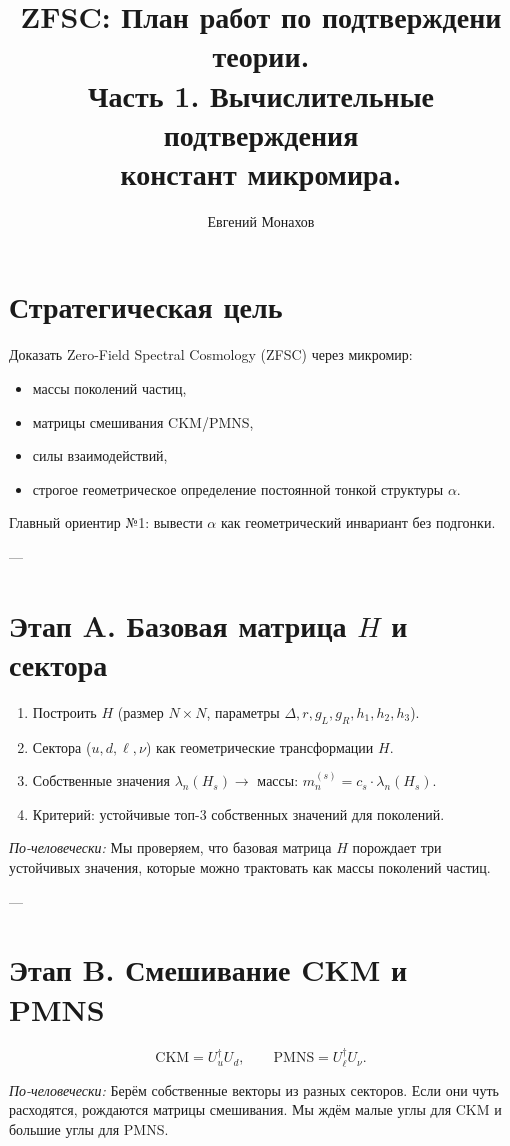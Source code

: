\documentclass[a4paper,12pt]{article}
\title{ZFSC: План работ по подтверждени теории.\\ Часть 1. Вычислительные подтверждения \\ констант микромира.}
\author{Евгений Монахов}
\date{}
\begin{document}
\maketitle

\section*{Стратегическая цель}
Доказать Zero-Field Spectral Cosmology (ZFSC) через микромир:
\begin{itemize}
  \item массы поколений частиц,
  \item матрицы смешивания CKM/PMNS,
  \item силы взаимодействий,
  \item строгое геометрическое определение постоянной тонкой структуры $\alpha$.
\end{itemize}
Главный ориентир №1: вывести $\alpha$ как геометрический инвариант без подгонки.

---

\section*{Этап A. Базовая матрица $H$ и сектора}
\begin{enumerate}
  \item Построить $H$ (размер $N\times N$, параметры $\Delta,r,g_L,g_R,h_1,h_2,h_3$).
  \item Сектора ($u,d,\ell,\nu$) как геометрические трансформации $H$.
  \item Собственные значения $\lambda_n(H_s)\to$ массы: $m_n^{(s)}=c_s\cdot \lambda_n(H_s)$.
  \item Критерий: устойчивые топ-3 собственных значений для поколений.
\end{enumerate}

\textit{По-человечески:}  
Мы проверяем, что базовая матрица $H$ порождает три устойчивых значения,
которые можно трактовать как массы поколений частиц.

---

\section*{Этап B. Смешивание CKM и PMNS}
\[
  \mathrm{CKM} = U_u^\dagger U_d, 
  \qquad
  \mathrm{PMNS} = U_\ell^\dagger U_\nu .
\]

\textit{По-человечески:}  
Берём собственные векторы из разных секторов.  
Если они чуть расходятся, рождаются матрицы смешивания.  
Мы ждём малые углы для CKM и большие углы для PMNS.
\end{document}
